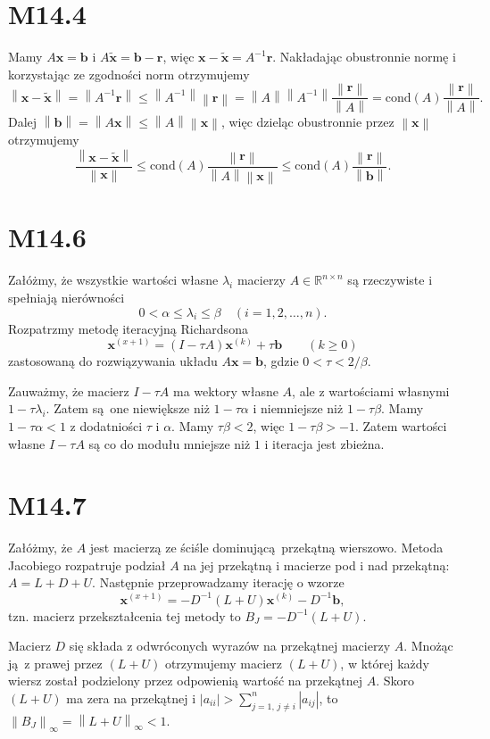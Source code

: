 \documentclass[a4paper, 12pt]{article}
\newcommand{\norm}[1]{\left\lVert #1 \right\rVert}
\newcommand{\modulus}[1]{\left| #1 \right|}
\newcommand{\abs}{\modulus}
\newcommand{\+}{\enspace}
\begin{document}
\section*{M14.4}
Mamy
$A\mathbf{x} = \mathbf{b}$
i
$A\tilde{\mathbf{x}} = \mathbf{b}-\mathbf{r}$, więc %
$\mathbf{x}-\tilde{\mathbf{x}} = A^{-1}\mathbf{r}$.
Nakładając obustronnie normę i korzystając ze zgodności norm otrzymujemy
$$\norm{\mathbf{x}-\tilde{\mathbf{x}}}
= \norm{A^{-1}\mathbf{r}}
≤ \norm{A^{-1}}\norm{\mathbf{r}}
= \norm{A}\norm{A^{-1}}\frac{\norm{\mathbf{r}}}{\norm{A}}
= \mathrm{cond}(A)\frac{\norm{\mathbf{r}}}{\norm{A}}.$$
Dalej $\norm{\mathbf{b}} = \norm{A\mathbf{x}} ≤ \norm{A} \norm{\mathbf{x}}$,
więc dzieląc obustronnie przez $\norm{\mathbf{x}}$ otrzymujemy
$$\frac{\norm{\mathbf{x}-\tilde{\mathbf{x}}}}{\norm{\mathbf{x}}}
≤ \mathrm{cond}(A)\frac{\norm{\mathbf{r}}}{\norm{A}\norm{\mathbf{x}}}
≤ \mathrm{cond}(A)\frac{\norm{\mathbf{r}}}{\norm{\mathbf{b}}}.$$

\section*{M14.6}
Załóżmy, że wszystkie wartości własne $λ_i$ macierzy $A ∈ ℝ^{n × n}$ są
rzeczywiste i spełniają nierówności
$$0 < α ≤ λ_i ≤ β \quad (i=1,2,…,n).$$
Rozpatrzmy metodę iteracyjną Richardsona
$$\mathbf{x}^{(x+1)} = (I-τA)\mathbf{x}^{(k)} + τ\mathbf{b} \qquad (k ≥ 0)$$
zastosowaną do rozwiązywania układu $A\mathbf{x}=\mathbf{b}$,
gdzie $0 < τ < 2/β$.

Zauważmy, że macierz $I-τA$ ma wektory własne $A$,
ale z wartościami własnymi $1 - τλ_i$.
Zatem są one niewiększe niż $1 - τα$ i niemniejsze niż $1 - τβ$.
Mamy $1- τα < 1$ z dodatniości $τ$ i $α$.
Mamy $τβ < 2$, więc $1- τβ > -1$.
Zatem wartości własne $I-τA$ są co do modułu mniejsze niż $1$
i iteracja jest zbieżna.

\section*{M14.7}
Załóżmy, że $A$ jest macierzą ze ściśle dominującą przekątną wierszowo.
Metoda Jacobiego rozpatruje podział $A$ na jej przekątną i macierze pod
i nad przekątną:
$A = L + D + U$.
Następnie przeprowadzamy iterację o wzorze
$$ \mathbf{x}^{(x+1)} = - D^{-1}(L + U)\mathbf{x}^{(k)} - D^{-1} \mathbf{b}, $$
tzn. macierz przekształcenia tej metody to $B_J = -D^{-1}(L+U)$.

Macierz $D$ się składa z odwróconych wyrazów na przekątnej macierzy $A$.
Mnożąc ją z prawej przez $(L+U)$ otrzymujemy macierz $(L+U)$,
w której każdy wiersz został podzielony przez odpowienią wartość na przekątnej
$A$.
Skoro $(L+U)$ ma zera na przekątnej i $\abs{a_{ii}} > ∑_{j=1, \, j≠i}^n \abs{a_{ij}}$,
to $\norm{B_J}_∞ = \norm{L+U}_∞ < 1$.
\end{document}
